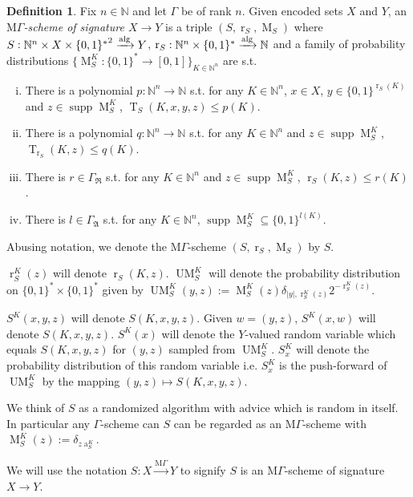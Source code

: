 \documentclass{article}
\numberwithin{equation}{section}
\theoremstyle{definition}
\newtheorem{definition}{Definition}[section]
\theoremstyle{plain}
\newcommand{\Bool}{\{0,1\}}
\newcommand{\Words}{{\Bool^*}}
\newcommand{\WordsLen}[1]{{\Bool^{#1}}}
\DeclareMathOperator{\Supp}{supp}
\DeclareMathOperator{\T}{T}
\DeclareMathOperator{\R}{r}
\DeclareMathOperator{\A}{a}
\DeclareMathOperator{\M}{M}
\DeclareMathOperator{\UM}{UM}
\newcommand{\Nats}{\mathbb{N}}
\newcommand{\Abs}[1]{\lvert #1 \rvert}
\newcommand{\GrowR}{\Gamma_{\mathfrak{R}}}
\newcommand{\GrowA}{\Gamma_{\mathfrak{A}}}
\newcommand{\MGrow}{\mathrm{M}\Gamma}
\newcommand{\Alg}{\xrightarrow{\textnormal{alg}}}
\newcommand{\MScheme}{\xrightarrow{\MGrow}}
\begin{document}
\begin{samepage}
\begin{definition}

Fix $n \in \Nats$ and let $\Gamma$ be of rank $n$. Given encoded sets $X$ and $Y$, an \emph{$\MGrow$-scheme of signature $X \rightarrow Y$} is a triple $(S,\R_S,\M_S)$ where $S: \Nats^n \times X \times \Words^2 \Alg Y$, $\R_S: \Nats^n \times \Words \Alg \Nats$ and a family of probability distributions $\{\M_S^K: \Words \rightarrow [0,1]\}_{K \in \Nats^n}$ are s.t.

\begin{enumerate}[(i)]

\item There is a polynomial $p: \Nats^n \rightarrow \Nats$ s.t. for any $K \in \Nats^n$, $x \in X$, ${y \in \WordsLen{\R_S(K)}}$ and $z \in \Supp \M_S^K$, $\T_S(K,x,y,z) \leq p(K)$.

\item There is a polynomial $q: \Nats^n \rightarrow \Nats$ s.t. for any $K \in \Nats^n$ and $z \in \Supp \M_S^K$, ${\T_{\R_S}(K,z) \leq q(K)}$.

\item There is $r \in \GrowR$ s.t. for any $K \in \Nats^n$ and $z \in \Supp \M_S^K$, $\R_S(K,z) \leq r(K)$.

\item There is $l \in \GrowA$ s.t. for any $K \in \Nats^n$, $\Supp \M_S^K \subseteq \WordsLen{l(K)}$.

\end{enumerate}

Abusing notation, we denote the $\MGrow$-scheme $(S,\R_S,\M_S)$ by $S$.

$\R_S^K(z)$ will denote $\R_S(K,z)$. $\UM_S^K$ will denote the probability distribution on ${\Words \times \Words}$ given by $\UM_S^K(y,z):= \M_S^K(z) \delta_{\Abs{y},\R_S^K(z)} 2^{-\R_S^K(z)}$.

$S^K(x,y,z)$ will denote $S(K,x,y,z)$. Given $w=(y,z)$, $S^K(x,w)$ will denote $S(K,x,y,z)$. $S^K(x)$ will denote the $Y$-valued random variable which equals $S(K,x,y,z)$ for $(y,z)$ sampled from $\UM_S^K$. $S_x^K$ will denote the probability distribution of this random variable i.e. $S_x^K$ is the push-forward of $\UM_S^K$ by the mapping $(y,z) \mapsto S(K,x,y,z)$.

We think of $S$ as a randomized algorithm with advice which is random in itself. In particular any $\Gamma$-scheme can $S$ can be regarded as an $\MGrow$-scheme with $\M_S^K(z):=\delta_{z\A_S^K}$.

We will use the notation $S: X \MScheme Y$ to signify $S$ is an $\MGrow$-scheme of signature $X \rightarrow Y$.

\end{definition}
\end{samepage}
\end{document}
